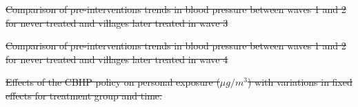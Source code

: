 \documentclass[
  letterpaper,
  DIV=11,
  numbers=noendperiod]{scrartcl}
\makeatletter
\renewenvironment{table}%
   {\renewcommand\familydefault\sfdefault
    \@float{table}}
   {\end@float}
\renewenvironment{figure}%
   {\renewcommand\familydefault\sfdefault
    \@float{figure}}
   {\end@float}
\providecommand{\DIFdeltex}[1]{{\protect\color{red}\sout{#1}}}                      %
\providecommand{\DIFdelFL}[1]{\DIFdel{#1}} %
\providecommand{\DIFdel}[1]{\texorpdfstring{\DIFdeltex{#1}}{}} %
\makeatother
\begin{document}

{%
\DIFdelFL{Comparison of pre-interventions trends in
blood pressure between waves 1 and 2 for never treated and villages
later treated in wave 3}}





{%
\DIFdelFL{Comparison of pre-interventions trends in
blood pressure between waves 1 and 2 for never treated and villages
later treated in wave 4}}





{%
\DIFdelFL{Effects of the CBHP policy on personal exposure (\(\mu g / m^{3}\)) with
variations in fixed effects for treatment group and time. }}%
\end{document}
